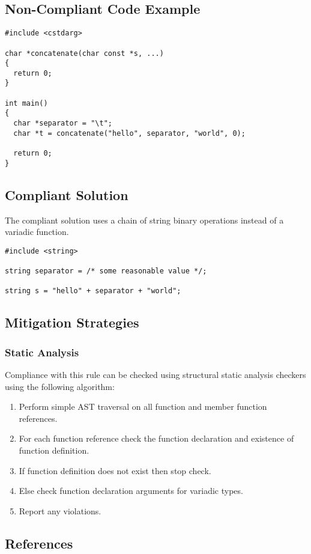 \subsection{Non-Compliant Code Example}


\begin{verbatim}
#include <cstdarg>

char *concatenate(char const *s, ...)
{
  return 0;
}

int main()
{
  char *separator = "\t";
  char *t = concatenate("hello", separator, "world", 0);

  return 0;
}
\end{verbatim}

\subsection{Compliant Solution}
The compliant solution uses a chain of string binary operations instead of a
variadic function.

\begin{verbatim}
#include <string>

string separator = /* some reasonable value */;

string s = "hello" + separator + "world";
\end{verbatim}

\subsection{Mitigation Strategies}
\subsubsection{Static Analysis} 

Compliance with this rule can be checked using structural static analysis checkers using the following algorithm:

\begin{enumerate}
\item Perform simple AST traversal on all function and member function references.
\item For each function reference check the function declaration and existence of function definition.
\item If function definition does not exist then stop check.
\item Else check function declaration arguments for variadic types.
\item Report any violations.
\end{enumerate}

\subsection{References}

